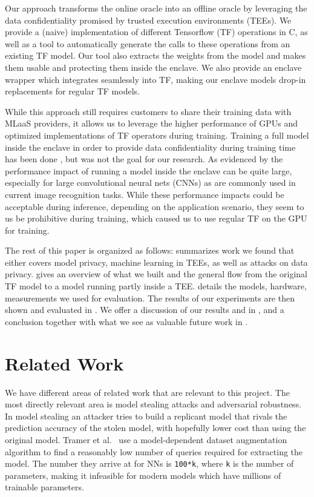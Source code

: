 \documentclass[11pt]{article}
\begin{document}
Our approach transforms the online oracle into an offline oracle by leveraging the data confidentiality promised by trusted execution environments (TEEs).
We provide a (naive) implementation of different Tensorflow (TF) operations in C, as well as a tool to automatically generate the calls to these operations from an existing TF model.
Our tool also extracts the weights from the model and makes them usable and protecting them inside the enclave.
We also provide an enclave wrapper which integrates seamlessly into TF, making our enclave models drop-in replacements for regular TF models.

While this approach still requires customers to share their training data with MLaaS providers, it allows us to leverage the higher performance of GPUs and optimized implementations of TF operators during training.
Training a full model inside the enclave in order to provide data confidentiality during training time has been done \cite{ohrimenko_oblivious_2016}, but was not the goal for our research.
As evidenced by  the performance impact of running a model inside the enclave can be quite large, especially for large convolutional neural nets (CNNs) as are commonly used in current image recognition tasks.
While these performance impacts could be acceptable during inference, depending on the application scenario, they seem to us be prohibitive during training, which caused us to use regular TF on the GPU for training.

The rest of this paper is organized as follows:
 summarizes work we found that either covers model privacy, machine learning in TEEs, as well as attacks on data privacy.
 gives an overview of what we built and the general flow from the original TF model to a model running partly inside a TEE.
 details the models, hardware, measurements we used for evaluation.
The results of our experiments are then shown and evaluated in .
We offer a discussion of our results and in , and a conclusion together with what we see as valuable future work in .

\section{Related Work}
\label{sec:related}
We have different areas of related work that are relevant to this project.
The most directly relevant area is model stealing attacks and adversarial robustness.
In model stealing an attacker tries to build a replicant model that rivals the prediction accuracy of the stolen model, with hopefully lower cost than using the original model.
Tramer et al.~\cite{tramer_stealing_2016} use a model-dependent dataset augmentation algorithm to find a reasonably low number of queries required for extracting the model.
The number they arrive at for NNs is \texttt{100*k}, where \texttt{k} is the number of parameters, making it infeasible for modern models which have millions of trainable parameters.
\end{document}
